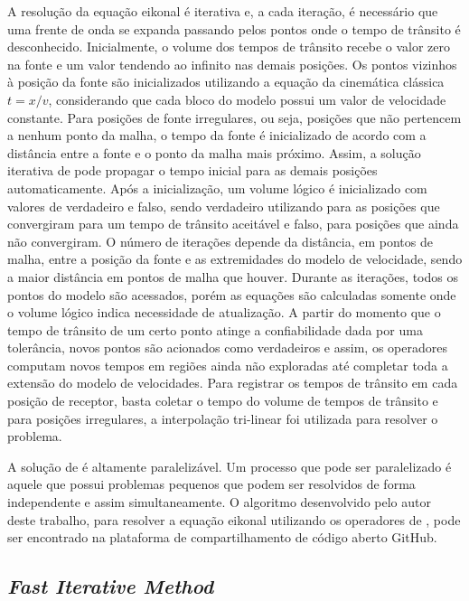 A resolução da equação eikonal é iterativa e, a cada iteração, é necessário que uma frente de onda se expanda passando pelos pontos onde o tempo de trânsito é desconhecido. Inicialmente, o volume dos tempos de trânsito recebe o valor zero na fonte e um valor tendendo ao infinito nas demais posições. Os pontos vizinhos à posição da fonte são inicializados utilizando a equação da cinemática clássica $t = x / v$, considerando que cada bloco do modelo possui um valor de velocidade constante. Para posições de fonte irregulares, ou seja, posições que não pertencem a nenhum ponto da malha, o tempo da fonte é inicializado de acordo com a distância entre a fonte e o ponto da malha mais próximo. Assim, a solução iterativa de  pode propagar o tempo inicial para as demais posições automaticamente. Após a inicialização, um volume lógico é inicializado com valores de verdadeiro e falso, sendo verdadeiro utilizando para as posições que convergiram para um tempo de trânsito aceitável e falso, para posições que ainda não convergiram. O número de iterações depende da distância, em pontos de malha, entre a posição da fonte e as extremidades do modelo de velocidade, sendo a maior distância em pontos de malha que houver. Durante as iterações, todos os pontos do modelo são acessados, porém as equações são calculadas somente onde o volume lógico indica necessidade de atualização. A partir do momento que o tempo de trânsito de um certo ponto atinge a confiabilidade dada por uma tolerância, novos pontos são acionados como verdadeiros e assim, os operadores computam novos tempos em regiões ainda não exploradas até completar toda a extensão do modelo de velocidades. Para registrar os tempos de trânsito em cada posição de receptor, basta coletar o tempo do volume de tempos de trânsito e para posições irregulares, a interpolação tri-linear foi utilizada para resolver o problema.  

A solução de  é altamente paralelizável. Um processo que pode ser paralelizado é aquele que possui problemas pequenos que podem ser resolvidos de forma independente e assim simultaneamente. O algoritmo desenvolvido pelo autor deste trabalho, para resolver a equação eikonal utilizando os operadores de , pode ser encontrado na plataforma de compartilhamento de código aberto GitHub.  

\subsection{\textit{Fast Iterative Method}}

